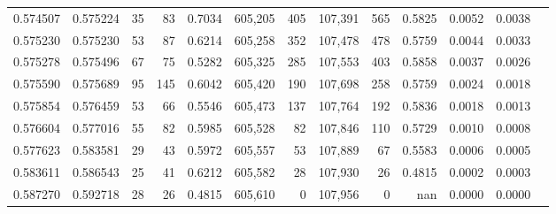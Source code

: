 \begin{tabular}{rrrrrrrrrrrrr}
0.574507 & 0.575224 &    35 &    83 &                                     0.7034 & 605,205 &     405 & 107,391 &     565 & 0.5825 & 0.0052 & 0.0038 \\
0.575230 & 0.575230 &    53 &    87 &                                     0.6214 & 605,258 &     352 & 107,478 &     478 & 0.5759 & 0.0044 & 0.0033 \\
0.575278 & 0.575496 &    67 &    75 &                                     0.5282 & 605,325 &     285 & 107,553 &     403 & 0.5858 & 0.0037 & 0.0026 \\
0.575590 & 0.575689 &    95 &   145 &                                     0.6042 & 605,420 &     190 & 107,698 &     258 & 0.5759 & 0.0024 & 0.0018 \\
0.575854 & 0.576459 &    53 &    66 &                                     0.5546 & 605,473 &     137 & 107,764 &     192 & 0.5836 & 0.0018 & 0.0013 \\
0.576604 & 0.577016 &    55 &    82 &                                     0.5985 & 605,528 &      82 & 107,846 &     110 & 0.5729 & 0.0010 & 0.0008 \\
0.577623 & 0.583581 &    29 &    43 &                                     0.5972 & 605,557 &      53 & 107,889 &      67 & 0.5583 & 0.0006 & 0.0005 \\
0.583611 & 0.586543 &    25 &    41 &                                     0.6212 & 605,582 &      28 & 107,930 &      26 & 0.4815 & 0.0002 & 0.0003 \\
0.587270 & 0.592718 &    28 &    26 &                                     0.4815 & 605,610 &       0 & 107,956 &       0 &    nan & 0.0000 & 0.0000 \\
\bottomrule
\end{tabular}
